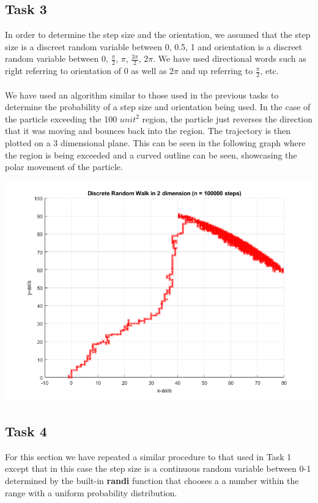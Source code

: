 \documentclass{article}
\begin{document}
\subsection{Task 3}
In order to determine the step size and the orientation, we assumed that the step size is a discreet random variable between {0, 0.5, 1} and orientation is a discreet random variable between {0, $\frac{\pi}{2}$, $\pi$, $\frac{3\pi}{2}$, $2\pi$}. We have used directional words such as right referring to orientation of 0 as well as $2\pi$ and up referring to $\frac{\pi}{2}$, etc. 
\\\\
We have used an algorithm similar to those used in the previous tasks to determine the probability of a step size and orientation being used. In the case of the particle exceeding the 100 $unit^{2}$ region, the particle just reverses the direction that it was moving and bounces back into the region. The trajectory is then plotted on a 3 dimensional plane. This can 
be seen in the following graph where the region is being exceeded and a curved outline can be seen, showcasing the polar movement of the particle.
\begin{center}
    \includegraphics[scale = 0.5]{task3bounce.png}
\end{center}
\subsection{Task 4}
For this section we have repeated a similar procedure to that used in Task 1 except that in this case the step size is a continuous random variable between 0-1 determined by the built-in \textbf{randi} function that chooses a a number within the range with a uniform probability distribution.
\end{document}
